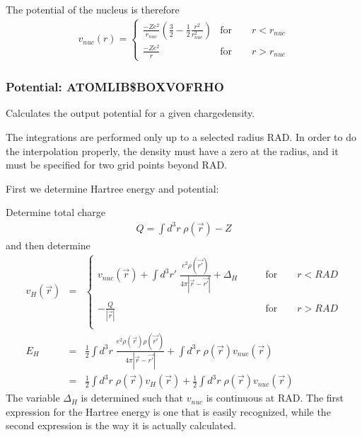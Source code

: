 \documentclass[11pt,a4paper]{report}
\begin{document}
The potential of the nucleus is therefore
\begin{eqnarray*}
v_{nuc}(r)=
\left\lbrace
\begin{array}{cc}
\frac{-Ze^2}{r_{nuc}}\left(\frac{3}{2}-\frac{1}{2}\frac{r^2}{r_{nuc}^2}\right)
&\textrm{for}\qquad r<r_{nuc}\\
\frac{-Ze^2}{r}
&\textrm{for}\qquad r>r_{nuc}
\end{array}\right.
\end{eqnarray*}

\subsubsection{Potential: ATOMLIB\$BOXVOFRHO}
Calculates the output potential for a given chargedensity. 

The integrations are performed only up to a selected radius RAD. In
order to do the interpolation properly, the density must have a zero
at the radius, and it must be specified for two grid points beyond
RAD.


First we determine Hartree energy and potential:

Determine total charge
\begin{eqnarray*}
Q=\int d^3r\;\rho(\vec{r})-Z
\end{eqnarray*}
and then determine 
\begin{eqnarray*}
v_H(\vec{r})&=&\left\lbrace
\begin{array}{ll}
v_{nuc}(\vec{r})+\int d^3r'\;
\frac{e^2\rho(\vec{r'})}{4\pi|\vec{r}-\vec{r'}|}
+\Delta_H &\qquad\text{for}\qquad r<RAD\\
\\
-\frac{Q}{|\vec{r}|} &\qquad\text{for}\qquad r>RAD\\
\end{array}\right.
\\
E_H&=&
\frac{1}{2}\int d^3r\; \frac{e^2\rho(\vec{r})\rho(\vec{r'})}
{4\pi|\vec{r}-\vec{r'}|}
+\int d^3r\; \rho(\vec{r})v_{nuc}(\vec{r})
\\
&=& \frac{1}{2}\int d^3r\; \rho(\vec{r})v_{H}(\vec{r})
+\frac{1}{2}\int d^3r\; \rho(\vec{r})v_{nuc}(\vec{r})
\end{eqnarray*}
The variable $\Delta_H$ is determined such that $v_{nuc}$ is
continuous at RAD. The first expression for the Hartree energy is one
that is easily recognized, while the second expression is the way it
is actually calculated.
\end{document}
